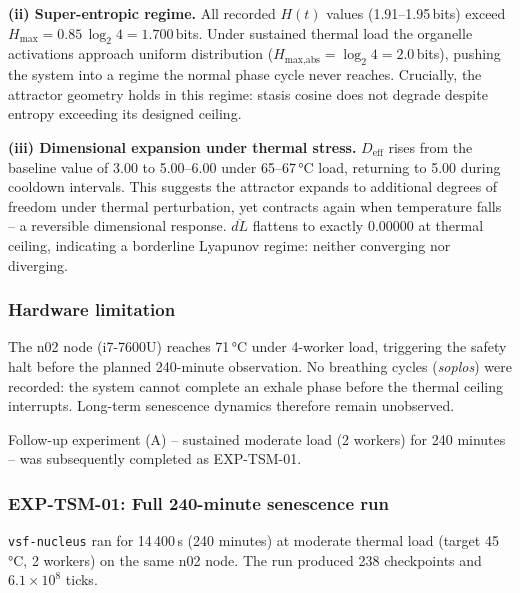 \documentclass[11pt, a4paper]{article}
\newcommand{\nucleus}{\texttt{vsf-nucleus}}
\begin{document}
\textbf{(ii) Super-entropic regime.}
All recorded $H(t)$ values (1.91--1.95\,bits) exceed
$H_\text{max} = 0.85\,\log_2 4 = 1.700$\,bits.
Under sustained thermal load the organelle activations approach uniform
distribution ($H_\text{max,abs} = \log_2 4 = 2.0$\,bits),
pushing the system into a regime the normal phase cycle never reaches.
Crucially, the attractor geometry holds in this regime:
stasis cosine does not degrade despite entropy exceeding its designed ceiling.

\textbf{(iii) Dimensional expansion under thermal stress.}
$D_\text{eff}$ rises from the baseline value of 3.00 to 5.00--6.00
under 65--67\,°C load, returning to 5.00 during cooldown intervals.
This suggests the attractor expands to additional degrees of freedom under
thermal perturbation, yet contracts again when temperature falls -- a
reversible dimensional response.
$\overline{dL}$ flattens to exactly 0.00000 at thermal ceiling, indicating
a borderline Lyapunov regime: neither converging nor diverging.

\subsubsection*{Hardware limitation}

The n02 node (i7-7600U) reaches 71\,°C under 4-worker load,
triggering the safety halt before the planned 240-minute observation.
No breathing cycles (\textit{soplos}) were recorded: the system cannot
complete an exhale phase before the thermal ceiling interrupts.
Long-term senescence dynamics therefore remain unobserved.

Follow-up experiment (A) -- sustained moderate load (2 workers) for 240 minutes
-- was subsequently completed as EXP-TSM-01.

\subsubsection*{EXP-TSM-01: Full 240-minute senescence run}

\nucleus{} ran for 14\,400\,s (240 minutes) at moderate thermal load
(target 45\,°C, 2 workers) on the same n02 node.
The run produced 238 checkpoints and $6.1 \times 10^8$ ticks.
\end{document}
